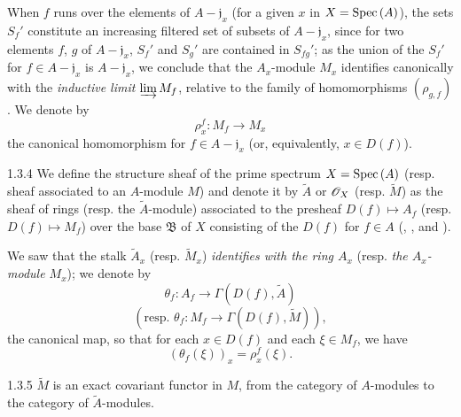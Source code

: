 When $f$ runs over the elements of $A-\mathfrak{j}_x$ (for a given $x$ in $X={\mathop{\mathrm{Spec}}\nolimits}\,(A)$), the
sets $S_f'$ constitute an increasing filtered set of subsets of $A-\mathfrak{j}_x$, since for
two elements $f$, $g$ of $A-\mathfrak{j}_x$, $S_f'$ and $S_g'$ are contained in $S_{fg}'$; as
the union of the $S_f'$ for $f\in A-\mathfrak{j}_x$ is $A-\mathfrak{j}_x$, we conclude
 that the $A_x$-module $M_x$ identifies canonically with the \emph{inductive
limit} $\varinjlim M_f$, relative to the family of homomorphisms $(\rho_{g,f})$. We denote by
\[
  \rho_x^f:M_f\longrightarrow M_x
\]
the canonical homomorphism for $f\in A-\mathfrak{j}_x$ (or, equivalently, $x\in D(f)$).

\begin{envs}[Definition]{1.3.4}
\label{defn-1.1.3.4}
We define the structure sheaf of the prime spectrum $X={\mathop{\mathrm{Spec}}\nolimits}\,(A)$ (resp. sheaf associated to
an $A$-module $M$) and denote it by $\widetilde{A}$ or $\mathscr{O}_X$ (resp. $\widetilde{M}$) as the
sheaf of rings (resp. the $\widetilde{A}$-module) associated to the presheaf
$D(f)\mapsto A_f$ (resp. $D(f)\mapsto M_f$) over the base $\mathfrak{B}$ of $X$ consisting
of the $D(f)$ for $f\in A$ (, , and ).
\end{envs}

We saw  that the stalk $\widetilde{A}_x$ (resp. $\widetilde{M}_x$)
\emph{identifies with the ring $A_x$} (resp. \emph{the $A_x$-module $M_x$}); we denote by
\[
  \theta_f:A_f\longrightarrow\Gamma(D(f),\widetilde{A})
\]
\[
  (\text{resp. }\theta_f:M_f\longrightarrow\Gamma(D(f),\widetilde{M})),
\]
the canonical map, so that for each $x\in D(f)$ and each $\xi\in M_f$, we have
\[
  (\theta_f(\xi))_x=\rho_x^f(\xi).
  \tag{1.3.4.1}
\]

\begin{envs}[Proposition]{1.3.5}
\label{prop-1.1.3.5}
$\widetilde{M}$ is an exact covariant functor in $M$, from the category of $A$-modules to the
category of $\widetilde{A}$-modules.
\end{envs}

